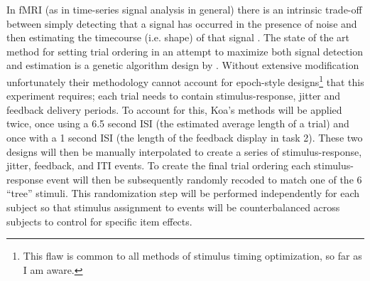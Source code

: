 In fMRI (as in time-series signal analysis in general) there is an intrinsic trade-off between simply detecting that a signal has occurred in the presence of noise and then estimating the timecourse (i.e. shape) of that signal \cite{Dale:1999p7901,Birn:2002p1777,Liu:2004p2141}.   The state of the art method for setting trial ordering in an attempt to maximize both signal detection and estimation is a genetic algorithm design by .  Without extensive modification unfortunately their methodology cannot account for epoch-style designs\footnote{This flaw is common to all methods of stimulus timing optimization, so far as I am aware.} that this experiment requires; each trial needs to contain stimulus-response, jitter and feedback delivery periods.  To account for this, Koa's methods will be applied twice, once using a 6.5 second ISI (the estimated average length of a trial) and once with a 1 second ISI (the length of the feedback display in task 2).  These two designs will then be manually interpolated to create a series of stimulus-response, jitter, feedback, and ITI events.  To create the final trial ordering each stimulus-response event will then be subsequently randomly recoded to match one of the 6 ``tree'' stimuli.  This randomization step will be performed independently for each subject so that stimulus assignment to events will be counterbalanced across subjects to control for specific item effects.  


